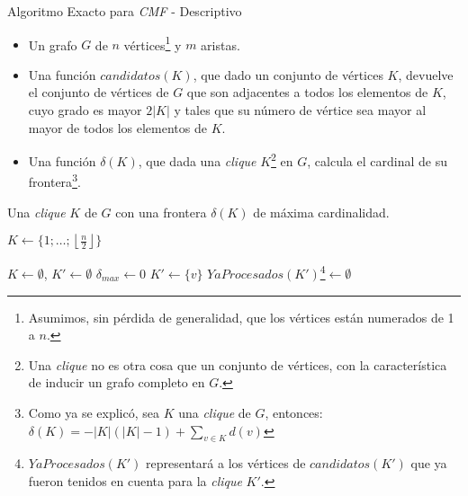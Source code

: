 \begin{minipage}{\textwidth}%
    \begin{algorithm}[H]
        \caption{Algoritmo Exacto para \emph{CMF} - Descriptivo}
        \begin{algorithmic}[1]
            \Require\Statex
                \begin{itemize}
                    \item Un grafo $G$ de $n$ v\'ertices\footnote{Asumimos, sin p\'erdida 
                        de generalidad, que los v\'ertices est\'an numerados de 1 a $n$.}
                        y $m$ aristas.

                    \item Una funci\'on $candidatos(K)$, que dado un conjunto de v\'ertices
                        $K$, devuelve el conjunto de v\'ertices de $G$ que son adjacentes
                        a todos los elementos de $K$, cuyo grado es mayor $2|K|$ y tales
                        que su n\'umero de v\'ertice sea mayor al mayor de todos los elementos
                        de $K$.

                    \item Una funci\'on $\delta(K)$, que dada una \emph{clique} $K$\footnote{Una
                        \emph{clique} no es otra cosa que un conjunto de v\'ertices, con la
                        caracter\'istica de inducir un grafo completo en $G$.} en $G$, calcula
                        el cardinal de su frontera\footnote{Como ya se explic\'o, sea $K$ una
                        \emph{clique} de $G$, entonces: $\delta(K) = - |K|(|K|-1) + \displaystyle\sum_{v \in
                        K} d(v)$}.

                \end{itemize}
            \Statex

            \Ensure Una \emph{clique} $K$ de $G$ con una frontera 
                $\delta(K)$ de m\'axima cardinalidad.
            \Statex

             
                \State $K \gets \{1;\dots;\left\lfloor\frac{n}{2}\right\rfloor\}$

            \Else
            \State $K \gets \emptyset$, $K' \gets \emptyset$
                \State $\delta_{max} \gets 0$
                    \State $K' \gets \{v\}$
                    \State $YaProcesados(K')$\footnote{$YaProcesados(K')$ representar\'a a
                        los v\'ertices de $candidatos(K')$ que ya fueron tenidos en cuenta
                        para la \emph{clique} $K'$.}$ \gets \emptyset$


\end{algorithmic}
\end{algorithm}
\end{minipage}
